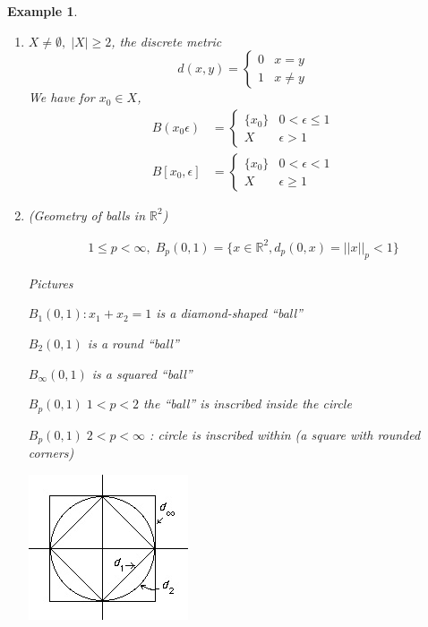 \documentclass[11pt, oneside]{book}
\theoremstyle{break}
\newtheorem{eg}{Example}[section]
\newcommand{\bb}[1]{\mathbb{#1}}			%
\begin{document}
\begin{eg}
	\begin{enumerate}
		\item $X \neq \emptyset, \; |X| \geq 2$, the discrete metric
			\begin{equation*}
				d(x,y) = 
					\begin{cases}
						0 & x = y \\
						1 & x \neq y
					\end{cases}
			\end{equation*}
			We have for $x_0 \in X$,
			\begin{align*}
				B(x_0 \epsilon) &= 
					\begin{cases}
						\{x_0\} & 0 < \epsilon \leq 1 \\
						X & \epsilon > 1
					\end{cases} \\
				B[x_0, \epsilon] &=
					\begin{cases}
						\{x_0\} & 0 < \epsilon < 1 \\
						X & \epsilon \geq 1
					\end{cases}
			\end{align*}

		\item (Geometry of balls in $\bb{R}^2$)

			\begin{gather*}
				1 \leq p < \infty, \; B_p(0, 1) = \{x \in \bb{R}^2, d_p(0, x) = ||x||_p < 1 \}
			\end{gather*}

			Pictures

			$B_1(0, 1) : x_1 + x_2 = 1$ is a diamond-shaped ``ball''

			$B_2(0, 1)$ is a round ``ball''

			$B_\infty(0, 1)$ is a squared ``ball''

			$B_p (0, 1) \; 1 < p < 2$ the ``ball'' is inscribed inside the circle

			$B_p(0, 1) \; 2 < p < \infty$ : circle is inscribed within (a square with rounded corners)

			\begin{center}
				\includegraphics{images/geometryOfBalls.jpg}	
			\end{center}
	\end{enumerate}
\end{eg}
\end{document}
